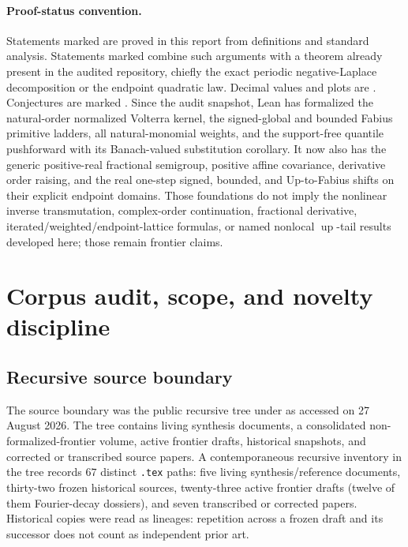 \documentclass[11pt,oneside]{article}
\theoremstyle{definition}
\theoremstyle{remark}
\newcommand{\Up}{\operatorname{up}}
\newcommand{\1}{\mathbf 1}
\begin{document}
\paragraph{Proof-status convention.}
Statements marked \statusproved{} are proved in this report from definitions and standard
analysis.  Statements marked \statusderived{} combine such arguments with a theorem already
present in the audited repository, chiefly the exact periodic negative-Laplace decomposition
or the endpoint quadratic law.  Decimal values and plots are \statusnumeric{}.  Conjectures
are marked \statusopen{}.  Since the audit snapshot, Lean has formalized the natural-order
normalized Volterra kernel, the signed-global and bounded Fabius primitive ladders, all
natural-monomial weights, and the support-free quantile pushforward with its Banach-valued
substitution corollary.  It now also has the generic positive-real fractional semigroup,
positive affine covariance, derivative order raising, and the real one-step signed, bounded,
and Up-to-Fabius shifts on their explicit endpoint domains.  Those foundations do not imply
the nonlinear inverse transmutation, complex-order continuation, fractional derivative,
iterated/weighted/endpoint-lattice formulas, or named nonlocal \(\Up\)-tail results developed
here; those remain frontier claims.


\clearpage

\section{Corpus audit, scope, and novelty discipline}
\label{p7:sec:audit}

\subsection{Recursive source boundary}

The source boundary was the public recursive tree under \repoPartxx{} as accessed on
27 August 2026.  The tree contains living synthesis documents, a consolidated
non-formalized-frontier volume, active frontier drafts, historical snapshots, and corrected or
transcribed source papers.  A contemporaneous recursive inventory in the tree records
$67$ distinct \texttt{.tex} paths: five living synthesis/reference documents, thirty-two
frozen historical sources, twenty-three active frontier drafts (twelve of them Fourier-decay
dossiers), and seven transcribed or corrected papers.  Historical copies were read as
lineages: repetition across a frozen draft and its successor does not count as independent
prior art.
\end{document}
